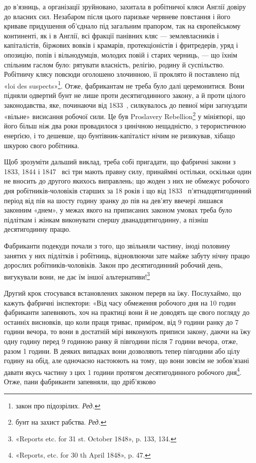 \parcont{}  %
до в’язниць, а організації зруйновано, захитала в робітничої
кляси Англії довіру до власних сил. Незабаром після цього паризьке
червневе повстання і його криваве придушення об’єднало
під загальним прапором, так на європейському континенті, як
і в Англії, всі фракції панівних кляс — землевласників і капіталістів,
біржових вовків і крамарів, протекціоністів і фритредерів,
уряд і опозицію, попів і вільнодумців, молодих повій і
старих черниць, — що їхнім спільним гаслом було: рятувати власність,
релігію, родину й суспільство. Робітничу клясу повсюди
оголошено злочинною, її проклято й поставлено під «loi des
suspects»\footnote*{
закон про підозрілих. \emph{Ред.}
}. Отже, фабрикантам не треба було далі церемонитися.
Вони підняли одвертий бунт не лише проти десятигодинного закону,
а й проти цілого законодавства, яке, починаючи від 1833~, силкувалось
до певної міри загнуздати «вільне» висисання робочої
сили. Це був Proslavery Rebellion\footnote*{
бунт на захист рабства. \emph{Ред.}
} у мініятюрі, що його більш
ніж два роки провадилося з цинічною нещадністю, з терористичною
енерґією, і то дешевше, що бунтівник-капіталіст нічим
не ризикував, хібащо шкурою свого робітника.

Щоб зрозуміти дальший виклад, треба собі пригадати, що
фабричні закони з 1833, 1844 і 1847~ всі три мають правну
силу, принаймні остільки, оскільки один не вносить до другого
якихось виправлень; що жоден з них не обмежує робочого дня
робітників-чоловіків старших за 18 років і що від 1833~ п’ятнадцятигодинний
період від пів на шосту годину зранку до пів
на дев’яту ввечері лишався законним «днем», у межах якого
на приписаних законом умовах треба було підліткам і жінкам
виконувати спершу дванадцятигодинну, а пізніш десятигодинну
працю.

Фабриканти подекуди почали з того, що звільняли частину,
іноді половину занятих у них підлітків і робітниць, відновлюючи
зате майже забуту нічну працю дорослих робітників-чоловіків.
Закон про десятигодинний робочий день, вигукували вони, не
дає їм іншої альтернативи!\footnote{
«Reports etc. for 31 st. October 1848», p. 133, 134.
}

Другий крок стосувався встановлених законом перерв на їжу.
Послухаймо, що кажуть фабричні інспектори: «Від часу обмеження
робочого дня на 10 годин фабриканти запевняють, хоч на практиці
вони й не доводять ще свого погляду до останніх висновків,
що коли праця триває, приміром, від 9 години ранку до 7 години
вечора, то вони в достатній мірі виконують приписи закону, даючи
на їжу одну годину перед 9 годиною ранку й півгодини після
7 години вечора, отже, разом 1 години. В деяких випадках
вони дозволяють тепер півгодини або цілу годину на обід, але одночасно
настоюють на тому, що вони зовсім не зобов’язані давати
якусь частину з цих 1 години протягом десятигодинного робочого
дня\footnote{
«Reports, etc. for 30 th April 1848», p. 47.
}. Отже, пани фабриканти запевняли, що дріб’язково
\parbreak{}  %

